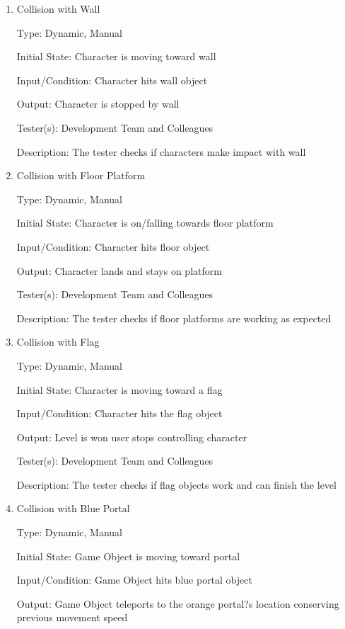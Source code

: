 \documentclass[12pt, titlepage]{article}
\begin{document}
\begin{enumerate}

\item{Collision with Wall\\}

Type: Dynamic, Manual

Initial State: Character is moving toward wall

Input/Condition: Character hits wall object

Output: Character is stopped by wall

Tester(s): Development Team and Colleagues

Description: The tester checks if characters make impact with wall


\item{Collision with Floor Platform\\}

Type: Dynamic, Manual

Initial State: Character is on/falling towards floor platform

Input/Condition: Character hits floor object

Output: Character lands and stays on platform

Tester(s): Development Team and Colleagues

Description: The tester checks if floor platforms are working as expected


\item{Collision with Flag\\}

Type: Dynamic, Manual

Initial State: Character is moving toward a flag

Input/Condition: Character hits the flag object

Output: Level is won user stops controlling character

Tester(s): Development Team and Colleagues

Description: The tester checks if flag objects work and can finish the level


\item{Collision with Blue Portal\\}

Type: Dynamic, Manual

Initial State: Game Object is moving toward portal

Input/Condition: Game Object hits blue portal object

Output: Game Object teleports to the orange portal?s location conserving previous movement speed


\end{enumerate}
\end{document}
